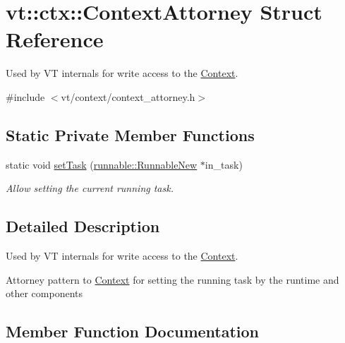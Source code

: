 \hypertarget{structvt_1_1ctx_1_1_context_attorney}{}\section{vt\+:\+:ctx\+:\+:Context\+Attorney Struct Reference}
\label{structvt_1_1ctx_1_1_context_attorney}


Used by VT internals for write access to the \hyperlink{structvt_1_1ctx_1_1_context}{Context}.  




{\ttfamily \#include $<$vt/context/context\+\_\+attorney.\+h$>$}

\subsection*{Static Private Member Functions}
\begin{DoxyCompactItemize}
\item 
static void \hyperlink{structvt_1_1ctx_1_1_context_attorney_aa9e72be8e7f7ccc50cc235b1177d8add}{set\+Task} (\hyperlink{structvt_1_1runnable_1_1_runnable_new}{runnable\+::\+Runnable\+New} $\ast$in\+\_\+task)
\begin{DoxyCompactList}\small\item\em Allow setting the current running task. \end{DoxyCompactList}\end{DoxyCompactItemize}


\subsection{Detailed Description}
Used by VT internals for write access to the \hyperlink{structvt_1_1ctx_1_1_context}{Context}. 

Attorney pattern to \hyperlink{structvt_1_1ctx_1_1_context}{Context} for setting the running task by the runtime and other components 

\subsection{Member Function Documentation}
\mbox{\label{structvt_1_1ctx_1_1_context_attorney_aa9e72be8e7f7ccc50cc235b1177d8add}} 
